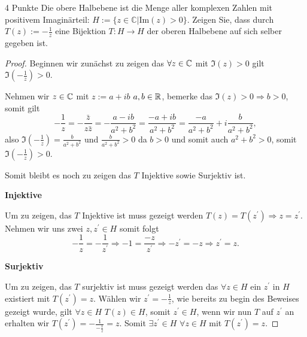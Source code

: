 \documentclass{../problemset}
\begin{document}
\begin{problem}{4 Punkte}
Die obere Halbebene ist die Menge aller komplexen Zahlen mit positivem Imaginärteil: $H := \{z \in \mathbb{C} | \text{Im}(z) > 0\}$. Zeigen Sie, dass durch $T(z) := -\frac{1}{z}$ eine Bijektion $T : H \rightarrow H$ der oberen Halbebene auf sich selber gegeben ist.

\begin{proof}
	Beginnen wir zunächst zu zeigen das $\forall z \in \mathbb{C}$ mit $\Im(z) > 0$ gilt $\Im(-\frac{1}{z}) > 0$.

	Nehmen wir $z \in \mathbb{C}$ mit $z := a + ib$ $a,b \in \mathbb{R}$, bemerke das
	$\Im(z) > 0 \Rightarrow b > 0$, somit gilt
	\[
		- \frac{1}{z} = - \frac{\bar{z}}{z\bar{z}} = - \frac{a - ib}{a^2 + b^2} = \frac{-a + ib}{a^2 + b^2} = \frac{-a}{a^2+b^2} + i\frac{b}{a^2+b^2},
	\] also $\Im(-\frac{1}{z}) = \frac{b}{a^2 + b^2}$ und $\frac{b}{a^2 + b^2} > 0$ da
	$b > 0$ und somit auch $a^2 + b^2 > 0$, somit $\Im(-\frac{1}{z}) > 0$.

	Somit bleibt es noch zu zeigen das $T$ Injektive sowie Surjektiv ist.

	\textbf{Injektive}

	Um zu zeigen, das $T$ Injektive ist muss gezeigt werden $T(z) = T(z^\prime)
		\Rightarrow z = z^\prime$. Nehmen wir uns zwei $z, z^\prime \in H$ somit folgt
	\[
		- \frac{1}{z} = - \frac{1}{z^\prime} \Rightarrow -1 = \frac{-z}{z^\prime} \Rightarrow -z^\prime = -z \Rightarrow z^\prime = z.
	\]

	\textbf{Surjektiv}

	Um zu zeigen, das $T$ surjektiv ist muss gezeigt werden das $\forall z \in H$
	ein $z^\prime$ in $H$ existiert mit $T(z^\prime) = z$. Wählen wir $z^\prime = -
		\frac{1}{z}$, wie bereits zu begin des Beweises gezeigt wurde, gilt $\forall z
		\in H$ $T(z) \in H$, somit $z^\prime \in H$, wenn wir nun $T$ auf $z^\prime$ an
	erhalten wir $T(z^\prime) = -\frac{1}{-\frac{1}{z}} = z$. Somit $\exists
		z^\prime \in H$ $\forall z \in H$ mit $T(z^\prime) = z$.

\end{proof}
\end{problem}
\end{document}
